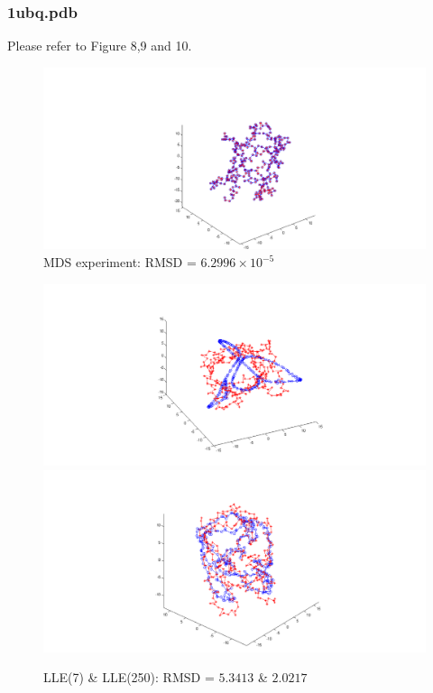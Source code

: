 \documentclass[12pt]{article} %
\begin{document}
\subsubsection{1ubq.pdb}
Please refer to Figure 8,9 and 10.

\begin{figure}[ht]\centering
	\includegraphics[width=\linewidth]{fig01}
	\caption{MDS experiment: RMSD = $6.2996 \times 10^{-5}$}
\end{figure}

\begin{figure}[ht]\centering
	\includegraphics[scale=0.2]{fig2}
	\includegraphics[scale=0.2]{fig5}
	\caption{LLE(7) \& LLE(250): RMSD = $5.3413$ \& $2.0217$}
\end{figure}
\end{document}
